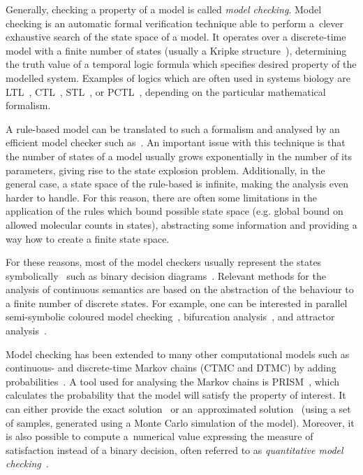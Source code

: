 \documentclass[11pt,a4paper]{report}
\begin{document}
Generally, checking a property of a model is called \emph{model checking}. Model checking is an automatic formal verification technique able to perform a~clever exhaustive search of the state space of a model. It operates over a discrete-time model with a finite number of states (usually a Kripke structure~\cite{kripke1963semantical}), determining the truth value of a temporal logic formula which specifies desired property of the modelled system. Examples of logics which are often used in systems biology are LTL~\cite{pnueli1977temporal}, CTL~\cite{clarke1986automatic}, STL~\cite{maler2004monitoring}, or PCTL~\cite{hasson1994logic}, depending on the particular mathematical formalism.

A rule-based model can be translated to such a formalism and analysed by an efficient model checker such as~\cite{cimatti2002nusmv}. An important issue with this technique is that the number of states of a model usually grows exponentially in the number of its parameters, giving rise to the state explosion problem. Additionally, in the general case, a state space of the rule-based is infinite, making the analysis even harder to handle. For this reason, there are often some limitations in the application of the rules which bound possible state space (e.g. global bound on allowed molecular counts in states), abstracting some information and providing a way how to create a finite state space.

For these reasons, most of the model checkers usually represent the states symbolically~\cite{burch1992symbolic} such as binary decision diagrams~\cite{bryant2001graph}. Relevant methods for the analysis of continuous semantics are based on the abstraction of the behaviour to a finite number of discrete states. For example, one can be interested in parallel semi-symbolic coloured model checking~\cite{benevs2016model}, bifurcation analysis~\cite{benevs2017discrete}, and attractor analysis~\cite{benevs2018fully}.

Model checking has been extended to many other computational models such as continuous- and discrete-time Markov chains (CTMC and DTMC) by adding probabilities~\cite{kwiatkowska2010probabilistic}. A tool used for analysing the Markov chains is PRISM~\cite{kwiatkowska2011prism}, which calculates the probability that the model will satisfy the property of interest. It can either provide the exact solution~\cite{aziz2000model} or an~approximated solution~\cite{jha2009bayesian} (using a set of samples, generated using a Monte Carlo simulation of the model). Moreover, it is also possible to compute a~numerical value expressing the measure of satisfaction instead of a binary decision, often referred to as \emph{quantitative model checking}~\cite{huth1997quantitative}.
\end{document}
